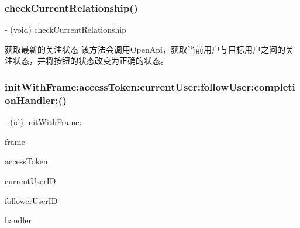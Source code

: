 \subsubsection{\texorpdfstring{check\+Current\+Relationship()}{checkCurrentRelationship()}\hspace{0.1cm}{\footnotesize\ttfamily [3/3]}}
{\footnotesize\ttfamily -\/ (void) check\+Current\+Relationship \begin{DoxyParamCaption}{ }\end{DoxyParamCaption}}

获取最新的关注状态 该方法会调用\+Open\+Api，获取当前用户与目标用户之间的关注状态，并将按钮的状态改变为正确的状态。 \mbox{\label{interface_w_b_s_d_k_relationship_button_a85b82fa757539a1509954d90b04c75a6}} 
\subsubsection{\texorpdfstring{init\+With\+Frame\+:access\+Token\+:current\+User\+:follow\+User\+:completion\+Handler\+:()}{initWithFrame:accessToken:currentUser:followUser:completionHandler:()}\hspace{0.1cm}{\footnotesize\ttfamily [1/3]}}
{\footnotesize\ttfamily -\/ (id) init\+With\+Frame\+: \begin{DoxyParamCaption}\item[{(C\+G\+Rect)}]{frame }\item[{accessToken:(N\+S\+String $\ast$)}]{access\+Token }\item[{currentUser:(N\+S\+String $\ast$)}]{current\+User\+ID }\item[{followUser:(N\+S\+String $\ast$)}]{follower\+User\+ID }\item[{completionHandler:(W\+B\+S\+D\+K\+Button\+Handler)}]{handler }\end{DoxyParamCaption}}


